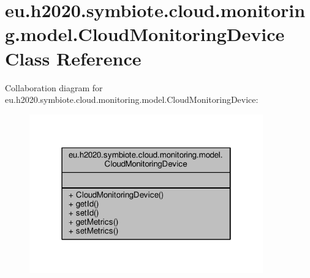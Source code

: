 \hypertarget{classeu_1_1h2020_1_1symbiote_1_1cloud_1_1monitoring_1_1model_1_1CloudMonitoringDevice}{}\section{eu.\+h2020.\+symbiote.\+cloud.\+monitoring.\+model.\+Cloud\+Monitoring\+Device Class Reference}
\label{classeu_1_1h2020_1_1symbiote_1_1cloud_1_1monitoring_1_1model_1_1CloudMonitoringDevice}


Collaboration diagram for eu.\+h2020.\+symbiote.\+cloud.\+monitoring.\+model.\+Cloud\+Monitoring\+Device\+:
\nopagebreak
\begin{figure}[H]
\begin{center}
\leavevmode
\includegraphics[width=286pt]{classeu_1_1h2020_1_1symbiote_1_1cloud_1_1monitoring_1_1model_1_1CloudMonitoringDevice__coll__graph}
\end{center}
\end{figure}
